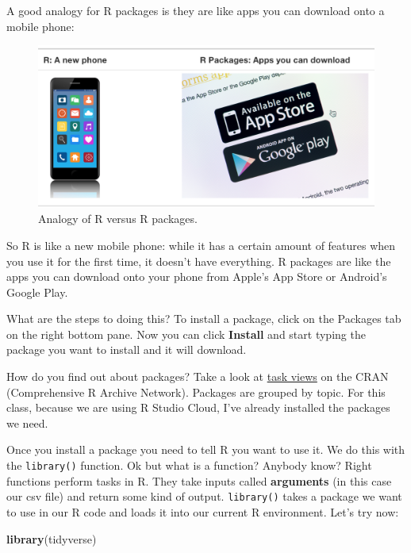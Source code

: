 \documentclass[]{book}
\newenvironment{Shaded}{\begin{snugshade}}{\end{snugshade}}
\newcommand{\KeywordTok}[1]{\textcolor[rgb]{0.13,0.29,0.53}{\textbf{#1}}}
\newcommand{\NormalTok}[1]{#1}
\begin{document}
A good analogy for R packages is they are like apps you can download onto a mobile phone:

\begin{figure}

{\centering \includegraphics[width=0.7\linewidth]{images/shutterstock/R_vs_R_packages} 

}

\caption{Analogy of R versus R packages.}\label{fig:R-vs-R-packages}
\end{figure}

So R is like a new mobile phone: while it has a certain amount of features when you use it for the first time, it doesn't have everything. R packages are like the apps you can download onto your phone from Apple's App Store or Android's Google Play.

What are the steps to doing this? To install a package, click on the Packages tab on the right bottom pane. Now you can click \textbf{Install} and start typing the package you want to install and it will download.

How do you find out about packages? Take a look at \href{https://cran.r-project.org/web/views/}{task views} on the CRAN (Comprehensive R Archive Network). Packages are grouped by topic. For this class, because we are using R Studio Cloud, I've already installed the packages we need.

Once you install a package you need to tell R you want to use it. We do this with the \texttt{library()} function. Ok but what is a function? Anybody know? Right functions perform tasks in R. They take inputs called \textbf{arguments} (in this case our csv file) and return some kind of output. \texttt{library()} takes a package we want to use in our R code and loads it into our current R environment. Let's try now:

\begin{Shaded}
\begin{Highlighting}[]
\KeywordTok{library}\NormalTok{(tidyverse)}
\end{Highlighting}
\end{Shaded}
\end{document}
